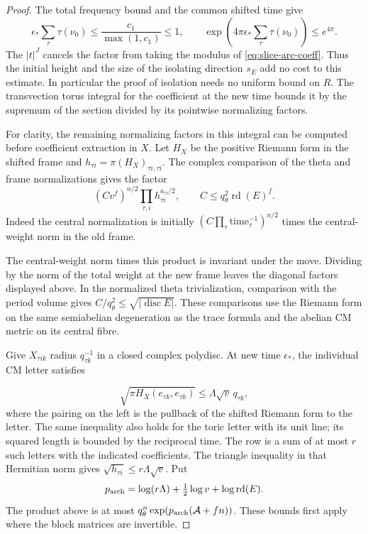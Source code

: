 \begin{proof}
The total frequency bound and the common shifted time give
\[
  \epsilon_*\sum_\tau\tau(\nu_0)\le\frac{c_1}{\max(1,c_1)}\le1,\qquad \exp\!\left(4\pi\epsilon_*\sum_\tau\tau(\nu_0)\right)\le e^{4\pi}.
\]
 The \(|t|^J\) cancels the factor
from taking the modulus of \eqref{eq:slice-arc-coeff}.
Thus the initial height and the size of the isolating direction
\(s_E\) add no cost to this estimate. In particular the proof of
isolation needs no uniform bound on \(R\). The transvection torus integral for the coefficient
at the new time bounds it by the supremum of the section
divided by its pointwise normalizing factors.

For clarity, the remaining normalizing factors in this
integral can be computed before coefficient extraction in
\(X\). Let \(H_X\) be the positive Riemann form in the
shifted frame and \(h_{\tau i}=\pi (H_X)_{\tau i,\tau i}\).
The complex comparison of the theta and frame
normalizations gives the factor
\[
 \left(C v^f\right)^{n/2}\prod_{\tau,i}h_{\tau i}^{a_{\tau i}/2},
 \qquad C\le q_\theta^2\operatorname{rd}(E)^f .
\]
Indeed the central normalization is initially
\((C\prod_\tau \mathrm{time}_\tau^{-1})^{n/2}\)
times the central-weight norm in the old frame.

The central-weight norm times this product is invariant
under the move. Dividing by the norm of the total weight
at the new frame leaves the diagonal factors displayed
above. In the normalized theta trivialization, comparison
with the period volume gives \(C/q_\theta^2\le
\sqrt{|\operatorname{disc}E|}\).
These comparisons use the Riemann form on the same
semiabelian degeneration as the trace formula and the
abelian CM metric on its central fibre.
\label{cor:slice-cm-coefficients-6}

Give \(X_{\tau i k}\) radius \(q_{\tau k}^{-1}\) in a closed
complex polydisc. At new time \(\epsilon_*\), the individual
CM letter satisfies

\[
  \sqrt{\pi H_X(e_{\tau k},e_{\tau k})}\le
\Lambda\sqrt v\,q_{\tau k},
\]
 where the pairing on the left
is the pullback of the shifted Riemann form to the letter.
The same inequality also holds for the toric letter with
its unit line; its squared length is bounded by the
reciprocal time. The row is a sum of at most \(r\) such
letters with the indicated coefficients. The triangle
inequality in that Hermitian norm gives
\(\sqrt{h_{\tau i}}\le r\Lambda\sqrt v\).
Put
\[
 p_{\rm arch}=\log(r\Lambda)
       +\tfrac12\log v+\log\operatorname{rd}(E).
\]
The product above is at most
\(q_\theta^n\exp(p_{\rm arch}(\mathcal A+fn))\).
These bounds first apply where the block matrices are
invertible.


\end{proof}
